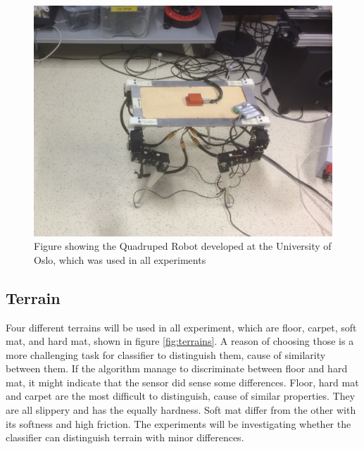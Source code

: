 \documentclass[USenglish]{ifimaster}  %
\begin{document}
\begin{figure}[h]
    \centering
    \includegraphics[width=\textwidth,height=\textheight,keepaspectratio]{Figures/Robot3}
    \caption{Figure showing the Quadruped Robot developed at the University of Oslo, which was used in all experiments}
    \label{fig:robot}
\end{figure}
\FloatBarrier

\subsection{Terrain} \label{seq:terrain}
Four different terrains will be used in all experiment, which are floor, carpet, soft mat, and hard mat, shown in figure \ref{fig:terrains}. A reason of choosing those is a more challenging task for classifier to distinguish them, cause of similarity between them. If the algorithm manage to discriminate between floor and hard mat, it might indicate that the sensor did sense some differences. Floor, hard mat and carpet are the most difficult to distinguish, cause of similar properties. They are all slippery and has the equally hardness. Soft mat differ from the other with its softness and high friction. The experiments will be investigating whether the classifier can distinguish terrain with minor differences.
\end{document}
